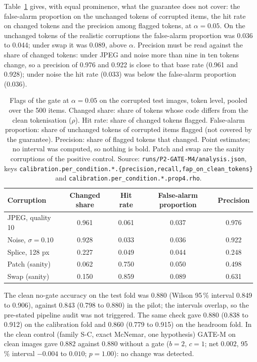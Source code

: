 Table~\ref{tab:res_flags} gives, with equal prominence, what the guarantee does not cover: the false-alarm proportion on the unchanged
tokens of corrupted items, the hit rate on changed tokens and the precision among flagged tokens, at $\alpha=0.05$.
On the unchanged tokens of the realistic corruptions the false-alarm proportion was 0.036 to 0.044; under swap it was 0.089, above
$\alpha$.
Precision must be read against the share of changed tokens: under JPEG and noise more than nine in ten tokens change, so a precision of
0.976 and 0.922 is close to that base rate (0.961 and 0.928); under noise the hit rate (0.033) was below the false-alarm proportion
(0.036).

\begin{table}[!tbp]
\centering
\caption{Flags of the gate at $\alpha=0.05$ on the corrupted test images, token level, pooled over the 500 items. Changed share: share of
tokens whose code differs from the clean tokenisation ($\rho$). Hit rate: share of changed tokens flagged. False-alarm proportion:
share of unchanged tokens of corrupted items flagged (not covered by the guarantee). Precision: share of flagged tokens that changed.
Point estimates; no interval was computed, so nothing is bold. Patch and swap are the sanity corruptions of the positive control.
Source: \nolinkurl{runs/P2-GATE-M4/analysis.json}, keys \nolinkurl{calibration.per_condition.*.{precision,recall,fap_on_clean_tokens}}
and \nolinkurl{calibration.per_condition.*.prop4.rho}.}
\label{tab:res_flags}
\footnotesize
\begin{tabular}{lcccc}
\toprule
Corruption & Changed share & Hit rate & False-alarm proportion & Precision \\
\midrule
JPEG, quality 10 & 0.961 & 0.061 & 0.037 & 0.976 \\
Noise, $\sigma=0.10$ & 0.928 & 0.033 & 0.036 & 0.922 \\
Splice, 128 px & 0.227 & 0.049 & 0.044 & 0.248 \\
\midrule
Patch (sanity) & 0.062 & 0.750 & 0.050 & 0.498 \\
Swap (sanity) & 0.150 & 0.859 & 0.089 & 0.631 \\
\bottomrule
\end{tabular}
\end{table}

The clean no-gate accuracy on the test fold was 0.880 (Wilson 95\,\% interval 0.849 to 0.906), against 0.843 (0.798 to 0.880) in the
pilot; the intervals overlap, so the pre-stated pipeline audit was not triggered.
The same check gave 0.880 (0.838 to 0.912) on the calibration fold and 0.860 (0.779 to 0.915) on the headroom fold.
In the clean control (family S-C, exact McNemar, one hypothesis) GATE-M on clean images gave 0.882 against 0.880 without a gate ($b=2$,
$c=1$; net $0.002$, 95\,\% interval $-0.004$ to $0.010$; $p=1.00$): no change was detected.


